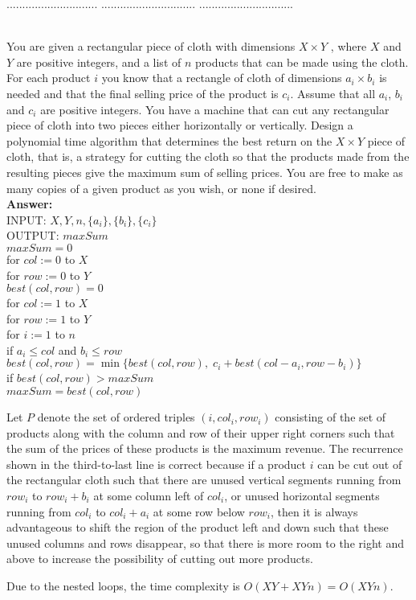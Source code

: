\documentclass[a4paper,11pt]{article}
\begin{document}
\pagebreak
{} $.............................$
 $..............................$
          $..............................$\\

\bigskip
{}\\
You are given a rectangular piece of cloth with dimensions $X\times Y$ , where $X$ and
$Y$ are positive integers, and a list of $n$ products that can be made using the cloth. For each
product $i$ you know that a rectangle of cloth of dimensions $a_i \times b_i$ is needed and that the final selling price of the product is $c_i$.
Assume that all $a_i$, $b_i$ and $c_i$ are positive integers. 
You have a machine that can cut any rectangular piece of cloth into two pieces either horizontally or
vertically. 
Design a polynomial time algorithm that determines the best return on the $X\times Y$ piece of cloth, that
is, a strategy for cutting the cloth so that the products made from the resulting pieces give the
maximum sum of selling prices. You are free to make as many copies of a given product as you
wish, or none if desired.\\
{\bf Answer:}\\
INPUT: $X, Y, n, \{ a_i \}, \{ b_i \}, \{ c_i \}$ \\
OUTPUT: $maxSum$ \\
$maxSum = 0$ \\
for $col := 0$ to $X$ \\
\indent for $row := 0$ to $Y$ \\
\indent \indent $best(col, row) = 0$ \\
for $col := 1$ to $X$ \\
\indent for $row := 1$ to $Y$ \\
\indent \indent for $i := 1$ to $n$ \\
\indent \indent \indent if $a_i \leq col$ and $b_i \leq row$ \\
\indent \indent \indent \indent $best(col, row) = \min\{ best(col, row), \; c_i + best(col - a_i, row - b_i) \}$ \\
\indent \indent \indent \indent if $best(col, row) > maxSum$ \\
\indent \indent \indent \indent \indent $maxSum = best(col, row)$ \par
Let $P$ denote the set of ordered triples $(i, col_i, row_i)$ consisting of the set of products along with the column and row of their upper right corners such that the sum of the prices of these products is the maximum revenue. The recurrence shown in the third-to-last line is correct because if a product $i$ can be cut out of the rectangular cloth such that there are unused vertical segments running from $row_i$ to $row_i + b_i$ at some column left of $col_i$, or unused horizontal segments running from $col_i$ to $col_i + a_i$ at some row below $row_i$, then it is always advantageous to shift the region of the product left and down such that these unused columns and rows disappear, so that there is more room to the right and above to increase the possibility of cutting out more products. \par
Due to the nested loops, the time complexity is $O(XY + XYn) = O(XYn)$.
\end{document}
